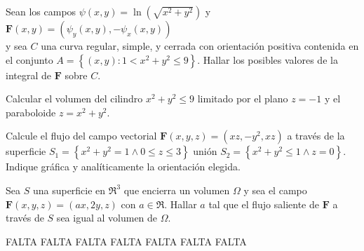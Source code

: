 
\begin{question}
    Sean los campos $\psi (x,y) = \ln(\sqrt{x^2+y^2})$ y $\boldsymbol{F}(x,y)= \left(\psi_y(x,y), -\psi_x(x,y)\right)$
    \\y sea $C$ una curva regular, simple, y cerrada con orientación positiva contenida en el conjunto
    $A=\left\{(x,y): 1 < x^2+y^2 \leq 9 \right\}$. Hallar los posibles valores de la integral de $\boldsymbol{F}$ sobre $C$.
\end{question}


\begin{question}
    Calcular el volumen del cilindro $x^2+y^2 \leq 9$ limitado por el plano $z=-1$ y el
    paraboloide $z=x^2+y^2$.
\end{question}


\begin{question}
    Calcule el flujo del campo vectorial $\boldsymbol{F}(x,y,z)= (xz,-y^2,xz)$ a través de la superficie
    $S_1=\left\{x^2+y^2=1 \land 0\leq z \leq 3\right\}$ unión $S_2=\left\{x^2+y^2\leq 1 \land z=0\right\}$.
    Indique gráfica y analíticamente la orientación elegida.
\end{question}



\begin{question}
    Sea $S$ una superficie en $\Re^3$ que encierra un volumen $\Omega$ y sea el campo
    $\boldsymbol{F}(x,y,z)=(ax,2y,z)$ con $a \in \Re$. Hallar $a$ tal que el flujo saliente de $\boldsymbol{F}$ a través de $S$
    sea igual al volumen de $\Omega$.
\end{question}

\newpage
\begin{solution}

    FALTA FALTA FALTA FALTA FALTA FALTA FALTA

\end{solution}


